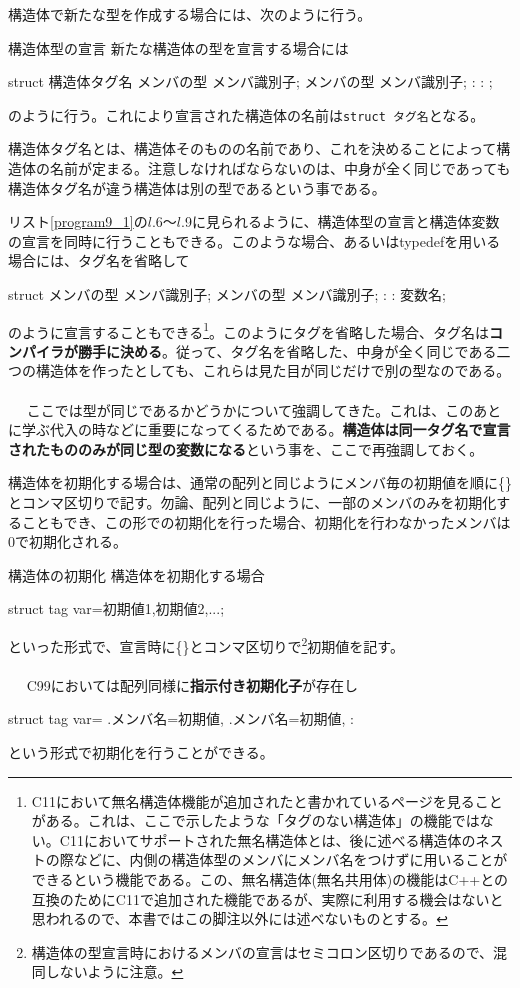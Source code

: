 構造体で新たな型を作成する場合には、次のように行う。
\begin{itembox}[l]{構造体型の宣言}
新たな構造体の型を宣言する場合には
\begin{code}
struct 構造体タグ名{
  メンバの型 メンバ識別子;
  メンバの型 メンバ識別子;
     :           :
};
\end{code}
のように行う。これにより宣言された構造体の名前は\verb|struct タグ名|となる。
\end{itembox}
構造体タグ名とは、構造体そのものの名前であり、これを決めることによって構造体の名前が定まる。注意しなければならないのは、中身が全く同じであっても構造体タグ名が違う構造体は別の型であるという事である。

リスト\ref{program9_1}の$l$.6〜$l$.9に見られるように、構造体型の宣言と構造体変数の宣言を同時に行うこともできる。このような場合、あるいはtypedefを用いる場合には、タグ名を省略して
\begin{code}
struct{
  メンバの型 メンバ識別子;
  メンバの型 メンバ識別子;
     :           :
} 変数名;
\end{code}
のように宣言することもできる\footnote{C11において無名構造体機能が追加されたと書かれているページを見ることがある。これは、ここで示したような「タグのない構造体」の機能ではない。C11においてサポートされた無名構造体とは、後に述べる構造体のネストの際などに、内側の構造体型のメンバにメンバ名をつけずに用いることができるという機能である。この、無名構造体(無名共用体)の機能はC++との互換のためにC11で追加された機能であるが、実際に利用する機会はないと思われるので、本書ではこの脚注以外には述べないものとする。}。このようにタグを省略した場合、タグ名は\textbf{コンパイラが勝手に決める}。従って、タグ名を省略した、中身が全く同じである二つの構造体を作ったとしても、これらは見た目が同じだけで別の型なのである。
\\ \\　
ここでは型が同じであるかどうかについて強調してきた。これは、このあとに学ぶ代入の時などに重要になってくるためである。\textbf{構造体は同一タグ名で宣言されたもののみが同じ型の変数になる}という事を、ここで再強調しておく。

構造体を初期化する場合は、通常の配列と同じようにメンバ毎の初期値を順に\{\}とコンマ区切りで記す。勿論、配列と同じように、一部のメンバのみを初期化することもでき、この形での初期化を行った場合、初期化を行わなかったメンバは0で初期化される。
\begin{itembox}[l]{構造体の初期化}
構造体を初期化する場合
\begin{code}
struct tag var={初期値1,初期値2,...};
\end{code}
といった形式で、宣言時に\{\}とコンマ区切りで\footnote{構造体の型宣言時におけるメンバの宣言はセミコロン区切りであるので、混同しないように注意。}初期値を記す。
\\ \\　
C99においては配列同様に\textbf{指示付き初期化子}が存在し
\begin{code}
struct tag var={
  .メンバ名=初期値,
  .メンバ名=初期値,
       :
}
\end{code}
という形式で初期化を行うことができる。
\end{itembox}

